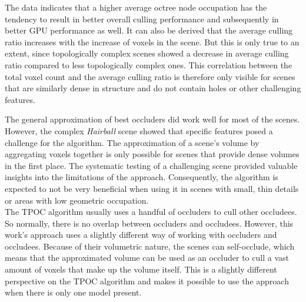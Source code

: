 \noindent
The data indicates that a higher average octree node occupation has the tendency to result in better overall culling 
performance and subsequently in better \ac{GPU} performance as well. It can also be derived that the average culling 
ratio increases with the increase of voxels in the scene. But this is only true to an extent, since topologically 
complex scenes showed a decrease in average culling ratio compared to less topologically complex ones. This correlation 
between the total voxel count and the average culling ratio is therefore only visible for scenes that are similarly 
dense in structure and do not contain holes or other challenging features. \\

\clearpage

\noindent
The general approximation of best occluders did work well for most of the scenes. However, the complex \emph{Hairball} 
scene showed that specific features posed a challenge for the algorithm. The approximation of a scene's volume by 
aggregating voxels together is only possible for scenes that provide dense volumes in the first place. The systematic 
testing of a challenging scene provided valuable insights into the limitations of the approach. Consequently, the 
algorithm is expected to not be very beneficial when using it in scenes with small, thin details or areas with low 
geometric occupation.\\

\noindent
The \ac{TPOC} algorithm usually uses a handful of occluders to cull other occludees. So normally, there is no overlap 
between occluders and occludees. However, this work's approach uses a slightly different way of working with occluders 
and occludees. Because of their volumetric nature, the scenes can self-occlude, which means that the approximated volume 
can be used as an occluder to cull a vast amount of voxels that make up the volume itself. This is a slightly different 
perspective on the \ac{TPOC} algorithm and makes it possible to use the approach when there is only one model present. \\

